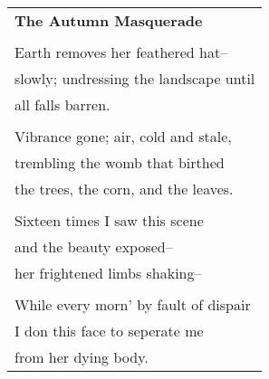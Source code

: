 \documentclass{article}
\begin{document}
\begin{center}
\begin{tabular}{l}
\textbf{The Autumn Masquerade} \\
\\
Earth removes her feathered hat-- \\
slowly; undressing the landscape until \\
all falls barren. \\
\\
Vibrance gone; air, cold and stale, \\
trembling the womb that birthed \\
the trees, the corn, and the leaves. \\
\\
Sixteen times I saw this scene \\
and the beauty exposed-- \\
her frightened limbs shaking-- \\
\\
While every morn' by fault of dispair \\
I don this face to seperate me \\
from her dying body. \\
\end{tabular}
\end{center}
\end{document}
